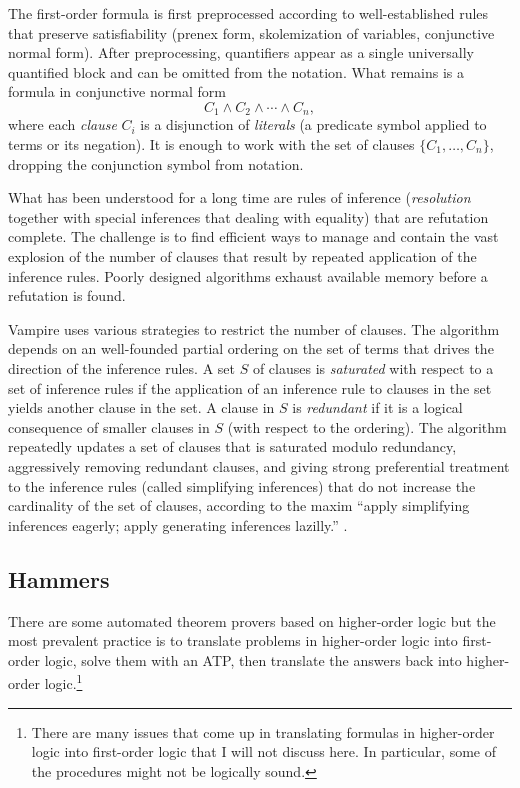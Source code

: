 \documentclass[brochure,english,12pt]{bourbaki}
\theoremstyle{plain}
\begin{document}
The first-order formula is first preprocessed according to well-established rules that preserve satisfiability
(prenex form, skolemization of variables, conjunctive normal form).  After preprocessing, quantifiers appear
as a single universally quantified block and can be omitted from the notation.  What remains is a 
formula in conjunctive normal form
\[
C_1 \land C_2 \land \cdots \land C_n,
\]
where each {\it clause} $C_i$ is a disjunction of {\it literals} (a predicate symbol applied to terms or its negation).
It is enough to work with the set of clauses $\{C_1,\ldots,C_n\}$, dropping the conjunction
symbol from notation.

What has been understood for a long time are rules of inference ({\it resolution}  together with
special inferences that dealing with equality) that are refutation complete.  The  challenge is to
find efficient ways to manage and contain the vast explosion of the number of clauses that result by repeated
application of the inference rules.  Poorly designed algorithms exhaust available memory before
a refutation is found.

Vampire uses various strategies to restrict the number of clauses.  The algorithm
depends on an well-founded partial ordering on the set of terms  that drives the direction of the 
 inference rules.  
A set $S$ of clauses
is {\it saturated} with respect to a set of inference rules if the application of an inference rule to clauses in the set
yields another clause in the set.  A clause in $S$ is {\it redundant} if it is a logical consequence of smaller clauses
in $S$ (with respect to the ordering).  
The algorithm repeatedly updates a set of clauses that is saturated
modulo redundancy, aggressively removing redundant clauses, and giving strong preferential
treatment to the inference rules (called simplifying inferences) that do not increase the cardinality of the set of clauses,
according to the maxim
 ``apply simplifying inferences eagerly; apply generating inferences lazilly.'' \cite{kovacs2013first}.


\subsection{Hammers}

There are some automated theorem provers based on higher-order logic %
but the most prevalent practice is to translate problems in higher-order logic into first-order logic,
solve them with an ATP, 
then translate the answers back into higher-order logic.\footnote{There are many
issues that come up in translating formulas in higher-order logic into first-order logic that I will not
discuss here.  In particular, some of the procedures might not be logically sound.}
\end{document}
